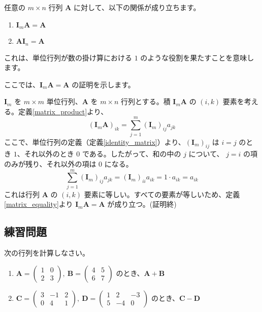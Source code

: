 \begin{thm}[単位行列の性質] \label{identity_matrix_property}
任意の $m \times n$ 行列 $\bm{A}$ に対して、以下の関係が成り立ちます。
\begin{enumerate}
\item $\bm{I}_m \bm{A} = \bm{A}$
\item $\bm{A} \bm{I}_n = \bm{A}$
\end{enumerate}
これは、単位行列が数の掛け算における $1$ のような役割を果たすことを意味します。
\begin{proof*}
ここでは、$\bm{I}_m \bm{A} = \bm{A}$ の証明を示します。\par
$\bm{I}_m$ を $m \times m$ 単位行列、$\bm{A}$ を $m \times n$ 行列とする。積 $\bm{I}_m \bm{A}$ の $(i,k)$ 要素を考える。定義\ref{matrix_product}より、
\[(\bm{I}_m \bm{A})_{ik} = \sum_{j=1}^{m} (\bm{I}_m)_{ij} a_{jk}\]
ここで、単位行列の定義（定義\ref{identity_matrix}）より、$ (\bm{I}_m)_{ij} $ は $i=j$ のとき $1$、それ以外のとき $0$ である。したがって、和の中の $j$ について、 $j=i$ の項のみが残り、それ以外の項は $0$ になる。
\[\sum_{j=1}^{m} (\bm{I}_m)_{ij} a_{jk} = (\bm{I}_m)_{ii} a_{ik} = 1 \cdot a_{ik} = a_{ik}\]
これは行列 $\bm{A}$ の $(i,k)$ 要素に等しい。すべての要素が等しいため、定義\ref{matrix_equality}より $\bm{I}_m \bm{A} = \bm{A}$ が成り立つ。(証明終)
\end{proof*}
\end{thm}

\subsection{練習問題}

\begin{quiz}
次の行列を計算しなさい。
\begin{enumerate}
\item $\bm{A} = \begin{pmatrix} 1 & 0 \\ 2 & 3 \end{pmatrix},\ \bm{B} = \begin{pmatrix} 4 & 5 \\ 6 & 7 \end{pmatrix}$ のとき、$\bm{A} + \bm{B}$
\item $\bm{C} = \begin{pmatrix} 3 & -1 & 2 \\ 0 & 4 & 1 \end{pmatrix},\ \bm{D} = \begin{pmatrix} 1 & 2 & -3 \\ 5 & -4 & 0 \end{pmatrix}$ のとき、$\bm{C} - \bm{D}$
\end{enumerate}
\end{quiz}

